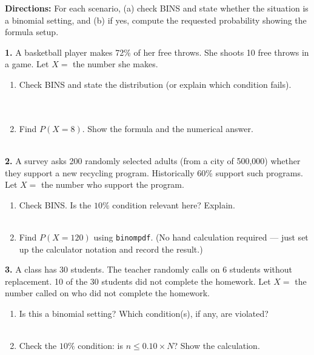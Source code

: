 \documentclass[10pt]{article}
\begin{document}
\namedateperiod

\vspace{0.1in}

\begin{practicebox}
\small
\textbf{Directions:} For each scenario, (a) check BINS and state whether the situation
is a binomial setting, and (b) if yes, compute the requested probability showing the
formula setup.

\vspace{10pt}
\textbf{1.} A basketball player makes 72\% of her free throws. She shoots 10 free
throws in a game. Let $X =$ the number she makes.
\begin{enumerate}[label=(\alph*), leftmargin=2em, itemsep=8pt]
  \item Check BINS and state the distribution (or explain which condition fails).\\
        \writeline\\[1pt]\writeline\\[1pt]\writeline
  \item Find $P(X = 8)$. Show the formula and the numerical answer.\\
        \writeline\\[1pt]\writeline
\end{enumerate}

\vspace{8pt}
\textbf{2.} A survey asks 200 randomly selected adults (from a city of 500{,}000)
whether they support a new recycling program. Historically 60\% support such
programs. Let $X =$ the number who support the program.
\begin{enumerate}[label=(\alph*), leftmargin=2em, itemsep=8pt]
  \item Check BINS. Is the $10\%$ condition relevant here? Explain.\\
        \writeline\\[1pt]\writeline
  \item Find $P(X = 120)$ using \texttt{binompdf}. (No hand calculation required ---
        just set up the calculator notation and record the result.)\\
        \writeline
\end{enumerate}

\vspace{8pt}
\textbf{3.} A class has 30 students. The teacher randomly calls on 6 students without
replacement. 10 of the 30 students did not complete the homework.
Let $X =$ the number called on who did not complete the homework.
\begin{enumerate}[label=(\alph*), leftmargin=2em, itemsep=8pt]
  \item Is this a binomial setting? Which condition(s), if any, are violated?\\
        \writeline\\[1pt]\writeline
  \item Check the $10\%$ condition: is $n \le 0.10 \times N$? Show the calculation.\\
        \writeline
\end{enumerate}


\end{practicebox}
\end{document}
